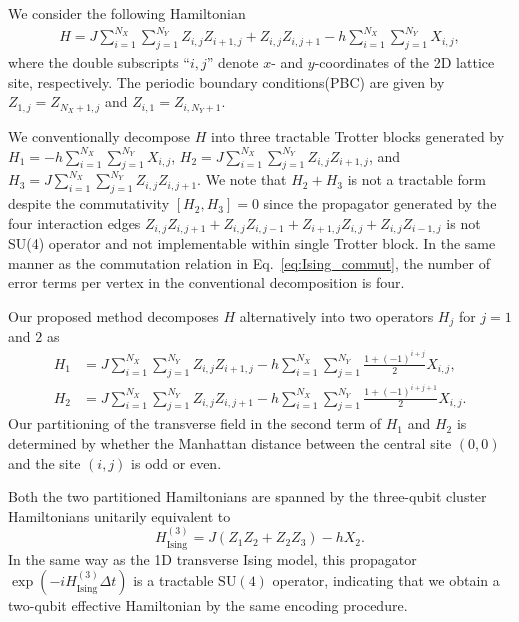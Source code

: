 \documentclass[aps,showpacs,amsmath,amssymb,twocolumn,prx,longbibliography,superscriptaddress,notitlepage,floatfix,10pt]{revtex4-2}
\begin{document}
We consider the following Hamiltonian 
\begin{equation}
\begin{split}
    H = J\sum_{i=1}^{N_X}\sum_{j=1}^{N_Y} Z_{i,j}Z_{i+1,j}+Z_{i,j}Z_{i,j+1} - h\sum_{i=1}^{N_X}\sum_{j=1}^{N_Y}X_{i,j},
\end{split}
\end{equation}
where the double subscripts ``$i,j$'' denote $x$- and $y$-coordinates of the 2D lattice site, respectively. The periodic boundary conditions(PBC) are given by $Z_{1,j}=Z_{N_X+1,j}$ and $Z_{i,1}=Z_{i,N_Y+1}$.

We conventionally decompose $H$ into three tractable Trotter blocks generated by $H_{1}=-h\sum_{i=1}^{N_X}\sum_{j=1}^{N_Y}X_{i,j}$, $H_{2}=J\sum_{i=1}^{N_X}\sum_{j=1}^{N_Y}Z_{i,j}Z_{i+1,j}$, and  $H_{3}=J\sum_{i=1}^{N_X}\sum_{j=1}^{N_Y}Z_{i,j}Z_{i,j+1}$. We note that $H_{2}+H_{3}$ is not a tractable form despite the commutativity $[H_{2},H_{3}]=0$ since the propagator generated by the four interaction edges $Z_{i,j}Z_{i,j+1}+Z_{i,j}Z_{i,j-1}+Z_{i+1,j}Z_{i,j}+Z_{i,j}Z_{i-1,j}$ is not SU(4) operator and not implementable within single Trotter block. In the same manner as the commutation relation in Eq.~\eqref{eq:Ising_commut}, the number of error terms per vertex in the conventional decomposition is four.

Our proposed method decomposes $H$ alternatively into two operators $H_{j}$ for $j=1$ and $2$ as
\begin{equation}
\begin{split}
    H_{1}&=J\sum_{i=1}^{N_X}\sum_{j=1}^{N_Y}Z_{i,j}Z_{i+1,j}-h\sum_{i=1}^{N_X}\sum_{j=1}^{N_Y}\frac{1+(-1)^{i+j}}{2}X_{i,j},\\
    H_{2}&=J\sum_{i=1}^{N_X}\sum_{j=1}^{N_Y}Z_{i,j}Z_{i,j+1}-h\sum_{i=1}^{N_X}\sum_{j=1}^{N_Y}\frac{1+(-1)^{i+j+1}}{2}X_{i,j}.
\end{split}
\end{equation}
Our partitioning of the transverse field in the second term of $H_{1}$ and $H_{2}$ is determined by whether the Manhattan distance between the central site $(0,0)$ and the site $(i,j)$ is odd or even.

Both the two partitioned Hamiltonians are spanned by the three-qubit cluster Hamiltonians unitarily equivalent to 
\begin{equation}
    H_{\mathrm{Ising}}^{(3)}=J(Z_{1}Z_{2}+Z_{2}Z_{3})-hX_{2}.
\end{equation}
In the same way as the 1D transverse Ising model, this propagator $\exp(-iH_{\mathrm{Ising}}^{(3)}\Delta t)$ is a tractable $\mathrm{SU}(4)$ operator, indicating that we obtain a two-qubit effective Hamiltonian by the same encoding procedure.
\end{document}
